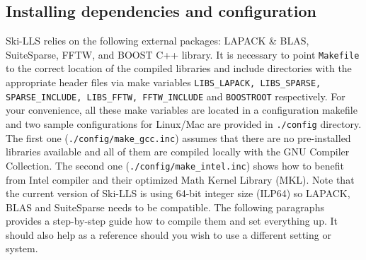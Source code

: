 \documentclass[english,11pt]{article}
\begin{document}
\subsection{Installing dependencies and configuration}
Ski-LLS relies on the following external packages: LAPACK \& BLAS, SuiteSparse, FFTW, and BOOST C++ library. It is necessary to point {\tt Makefile} to the correct location of the compiled libraries and include directories with the appropriate header files via make variables {\tt LIBS_LAPACK, LIBS_SPARSE, SPARSE_INCLUDE, LIBS_FFTW, FFTW_INCLUDE} and {\tt BOOSTROOT} respectively. For your convenience, all these make variables are located in a configuration makefile and two sample configurations for Linux/Mac are provided in {\tt ./config} directory. The first one ({\tt ./config/make_gcc.inc}) assumes that there are no pre-installed libraries available and all of them are compiled locally with the GNU Compiler Collection. The second one ({\tt ./config/make_intel.inc}) shows how to benefit from Intel compiler and their optimized Math Kernel Library (MKL). Note that the current version of Ski-LLS is using 64-bit integer size (ILP64) so LAPACK, BLAS and SuiteSparse needs to be compatible. The following paragraphs provides a step-by-step guide how to compile them and set everything up. It should also help as a reference should you wish to use a different setting or system.
\end{document}
